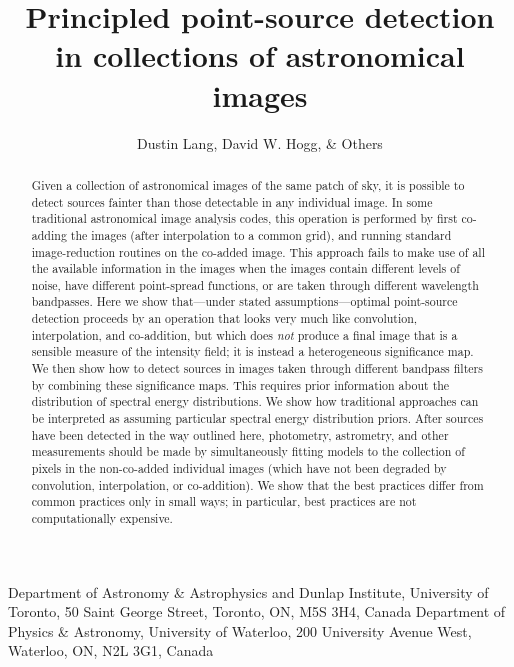 \documentclass[letterpaper,preprint]{aastex}
\newcounter{address}
\begin{document}
\title{Principled point-source detection in collections of astronomical images}
\author{%
  Dustin Lang,
  David W. Hogg,
  \& Others}

%
{Department of Astronomy \& Astrophysics and Dunlap Institute,
  University of Toronto,
  50 Saint George Street, Toronto, ON, M5S 3H4, Canada}
%
{Department of Physics \& Astronomy,
  University of Waterloo,
  200 University Avenue West,
  Waterloo, ON, N2L 3G1, Canada}

\begin{abstract}
  Given a collection of astronomical images of the same patch of sky, it is
  possible to detect sources fainter than those detectable in any
  individual image.
  In some traditional astronomical image analysis codes, this
  operation is performed by first co-adding the images (after
  interpolation to a common grid), and running standard image-reduction
  routines on the co-added image.
  This approach fails to make use of all the available information in
  the images when the images contain different levels of noise, have
  different point-spread functions, or are taken through different
  wavelength bandpasses.
  Here we show that---under stated assumptions---optimal point-source
  detection proceeds by an operation that looks very much like
  convolution, interpolation, and co-addition, but which does
  \emph{not} produce a final image that is a sensible measure of the
  intensity field; it is instead a heterogeneous significance map.
  We
  then show how to detect sources in images taken through different
  bandpass filters by combining these significance maps.  This
  requires prior information about the distribution of spectral energy
  distributions.  We show how traditional approaches can be
  interpreted as assuming particular spectral energy distribution
  priors.  After sources have been detected in the way
  outlined here, photometry, astrometry, and other measurements should
  be made by simultaneously fitting models to the collection of pixels
  in the non-co-added individual images (which have not been degraded
  by convolution, interpolation, or co-addition).  We show that the
  best practices differ from common practices only in small ways; in
  particular, best practices are not computationally expensive.
\end{abstract}
\end{document}
